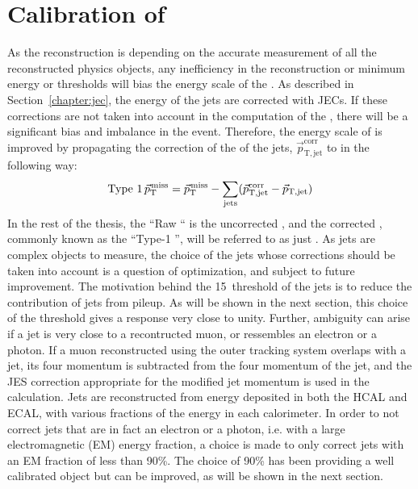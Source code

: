 \section{Calibration of \ptmiss} 
\label{sec:metcorrections}
As the \ptmiss reconstruction is depending on the accurate measurement of all the reconstructed physics objects, any inefficiency in the reconstruction or minimum energy or \pt thresholds will bias the energy scale of the \ptmiss. 
As described in Section~\ref{chapter:jec}, the energy of the jets are corrected with JECs. 
If these corrections are not taken into account in the computation of the \ptmiss, there will be a significant bias and imbalance in the event. 
Therefore, the energy scale of \ptmiss is improved by propagating the correction of the \pt of the jets, $\vec{p}_\mathrm{T,jet}^\mathrm{corr}$ to \ptmiss in the following way:
\begin{equation}
\text{Type 1} \, {\vec p}_{\mathrm{T}}^{\kern1pt\text{miss}}
={\vec p}_{\mathrm{T}}^{\kern1pt\text{miss}} - \sum_\mathrm{jets} (\vec{p}_\mathrm{T,jet}^\mathrm{corr}-\vec{p}_\mathrm{T,jet})
\label{eq:Type1MET}
\end{equation}                                                                          
In the rest of the thesis, the ``Raw \ptmiss`` is the uncorrected \ptmiss, and the corrected \ptmiss, commonly known as the ``Type-1 \ptmiss'', will be referred to as just \ptmiss.
As jets are complex objects to measure, the choice of the jets whose corrections should be taken into account is a question of optimization, and subject to future improvement. 
The motivation behind the 15~\GeV \pt threshold of the jets is to reduce the contribution of jets from pileup. 
As will be shown in the next section, this choice of the \pt threshold gives a response very close to unity. 
Further, ambiguity can arise if a jet is very close to a recontructed muon, or ressembles an electron or a photon. 
If a muon reconstructed using the outer tracking system overlaps with a jet, its four momentum is subtracted from the four momentum of the jet, and the JES correction appropriate for the modified jet momentum is used in the \ptmiss calculation. 
Jets are reconstructed from energy deposited in both the HCAL and ECAL, with various fractions of the energy in each calorimeter. 
In order to not correct jets that are in fact an electron or a photon, i.e. with a large electromagnetic (EM) energy fraction, a choice is made to only correct jets with an EM fraction of less than 90\%. 
The choice of 90\% has been providing a well calibrated \ptmiss object but can be improved, as will be shown in the next section.  
